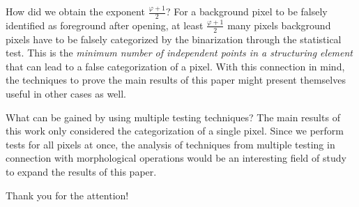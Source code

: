 \documentclass[presentation]{beamer}
\begin{document}
\begin{frame}
	\begin{block}{How did we obtain the exponent $\frac{\varphi + 1}{2}$?}
		For a background pixel to be falsely identified as foreground after opening, at least $\frac{\varphi + 1}{2}$ many pixels background pixels have to be falsely categorized by the binarization through the statistical test. This is the \emph{minimum number of independent points in a structuring element} that can lead to a false categorization of a pixel. With this connection in mind, the techniques to prove the main results of this paper might present themselves useful in other cases as well.
	\end{block}
	\pause
	\begin{block}{What can be gained by using multiple testing techniques?}
		The main results of this work only considered the categorization of a single pixel. Since we perform tests for all pixels at once, the analysis of techniques from multiple testing in connection with morphological operations would be an interesting field of study to expand the results of this paper.
	\end{block}
\end{frame}

\begin{frame}
	\centering
	Thank you for the attention!
\end{frame}
\end{document}
